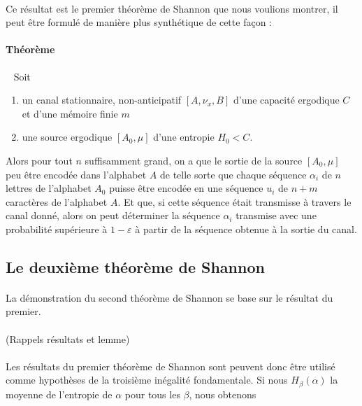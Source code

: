 	\paragraph{}
	Ce résultat est le premier théorème de Shannon que nous voulions montrer, il peut être formulé de manière plus synthétique de cette façon :
	
	\paragraph{Théorème}\ 
	\newline
	Soit 
	\begin{enumerate}
		\item un canal stationnaire, non-anticipatif $[A,\nu_x,B]$ d'une capacité ergodique $C$ et d'une mémoire finie $m$
		\item une source ergodique $[A_0,\mu]$ d'une entropie $H_0<C$.
	\end{enumerate}
	Alors pour tout $n$ suffisamment grand, on a que le sortie de la source $[A_0,\mu]$ peu être encodée dans l'alphabet $A$ de telle sorte que
	chaque séquence $\alpha_i$ de $n$ lettres de l'alphabet $A_0$ puisse être encodée en une séquence $u_i$ de $n+m$ caractères de l'alphabet $A$. 
	Et que, si cette séquence était transmisse à travers le canal donné, alors on peut déterminer la séquence $\alpha_i$ transmise avec une probabilité 
	supérieure à $1-\varepsilon$ à partir de la séquence obtenue à la sortie du canal.
	
\subsection{Le deuxième théorème de Shannon}

	\paragraph{}La démonstration du second théorème de Shannon se base sur le résultat du premier. 
	
	\paragraph{}
	(Rappels résultats et lemme)
	
	\paragraph{}
	Les résultats du premier théorème de Shannon sont peuvent donc être utilisé comme hypothèses de la troisième inégalité fondamentale.
	Si nous $H_\beta(\alpha)$ la moyenne de l'entropie de $\alpha$ pour tous les $\beta$, nous obtenons
	
